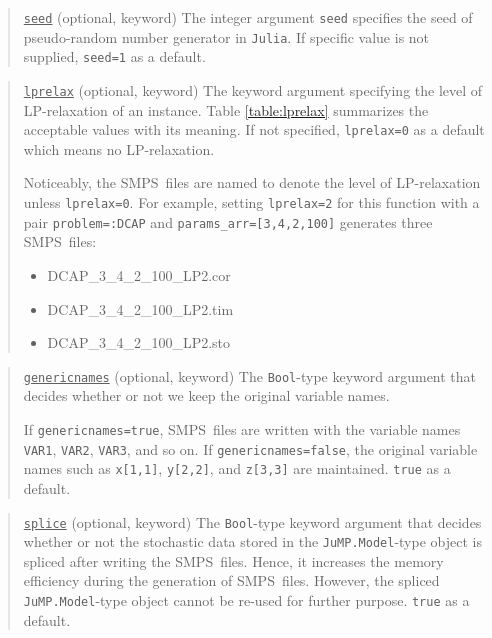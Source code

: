 \documentclass{hitec}
\newcommand{\smps}{\textsf{SMPS}}
\newcommand{\julia}{\texttt{Julia}}
\newcommand{\jumpmodel}{\texttt{JuMP.Model}}
\begin{document}
	\begin{quote}
		\noindent\underline{\texttt{seed}} (optional, keyword) The integer argument \texttt{seed} specifies the seed of pseudo-random number generator in \julia. If specific value is not supplied, \texttt{seed=1} as a default.
	\end{quote}
	
	\begin{quote}
		\noindent\underline{\texttt{lprelax}} (optional, keyword) The keyword argument specifying the level of LP-relaxation of an instance. Table \ref{table:lprelax} summarizes the acceptable values with its meaning. If not specified, \texttt{lprelax=0} as a default which means no LP-relaxation.
		
		Noticeably, the \smps\ files are named to denote the level of LP-relaxation unless \texttt{lprelax=0}. For example, setting \texttt{lprelax=2} for this function with a pair \texttt{problem=:DCAP} and \texttt{params\_arr=[3,4,2,100]} generates three \smps\ files: 
		\begin{itemize}
			\item DCAP\_3\_4\_2\_100\_LP2.cor
			\item DCAP\_3\_4\_2\_100\_LP2.tim
			\item DCAP\_3\_4\_2\_100\_LP2.sto
		\end{itemize}
	\end{quote}
	
	\begin{quote}
		\noindent\underline{\texttt{genericnames}} (optional, keyword) The \texttt{Bool}-type keyword argument that decides whether or not we keep the original variable names. 
		
		If \texttt{genericnames=true}, \smps\ files are written with the variable names \texttt{VAR1}, \texttt{VAR2}, \texttt{VAR3}, and so on. If \texttt{genericnames=false}, the original variable names such as \texttt{x[1,1]}, \texttt{y[2,2]}, and \texttt{z[3,3]} are maintained. \texttt{true} as a default.
	\end{quote}
	
	\begin{quote}
		\noindent\underline{\texttt{splice}} (optional, keyword) The \texttt{Bool}-type keyword argument that decides whether or not the stochastic data stored in the \jumpmodel-type object is spliced after writing the \smps\ files. Hence, it increases the memory efficiency during the generation of \smps\ files. However, the spliced \jumpmodel-type object cannot be re-used for further purpose. \texttt{true} as a default.
	\end{quote}
	
\end{document}

